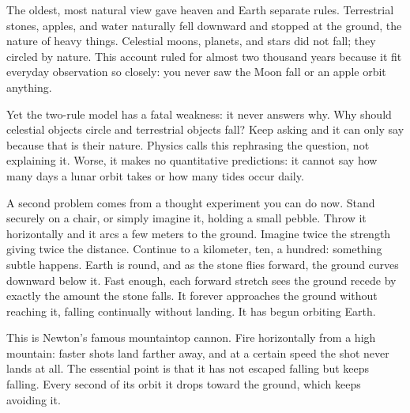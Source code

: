 The oldest, most natural view gave heaven and Earth separate rules. Terrestrial stones, apples, and water naturally fell downward and stopped at the ground, the nature of heavy things. Celestial moons, planets, and stars did not fall; they circled by nature. This account ruled for almost two thousand years because it fit everyday observation so closely: you never saw the Moon fall or an apple orbit anything.

Yet the two-rule model has a fatal weakness: it never answers why. Why should celestial objects circle and terrestrial objects fall? Keep asking and it can only say because that is their nature. Physics calls this rephrasing the question, not explaining it. Worse, it makes no quantitative predictions: it cannot say how many days a lunar orbit takes or how many tides occur daily.

A second problem comes from a thought experiment you can do now. Stand securely on a chair, or simply imagine it, holding a small pebble. Throw it horizontally and it arcs a few meters to the ground. Imagine twice the strength giving twice the distance. Continue to a kilometer, ten, a hundred: something subtle happens. Earth is round, and as the stone flies forward, the ground curves downward below it. Fast enough, each forward stretch sees the ground recede by exactly the amount the stone falls. It forever approaches the ground without reaching it, falling continually without landing. It has begun orbiting Earth.

This is Newton's famous mountaintop cannon. Fire horizontally from a high mountain: faster shots land farther away, and at a certain speed the shot never lands at all. The essential point is that it has not escaped falling but keeps falling. Every second of its orbit it drops toward the ground, which keeps avoiding it.

\begin{center}
\end{center}

